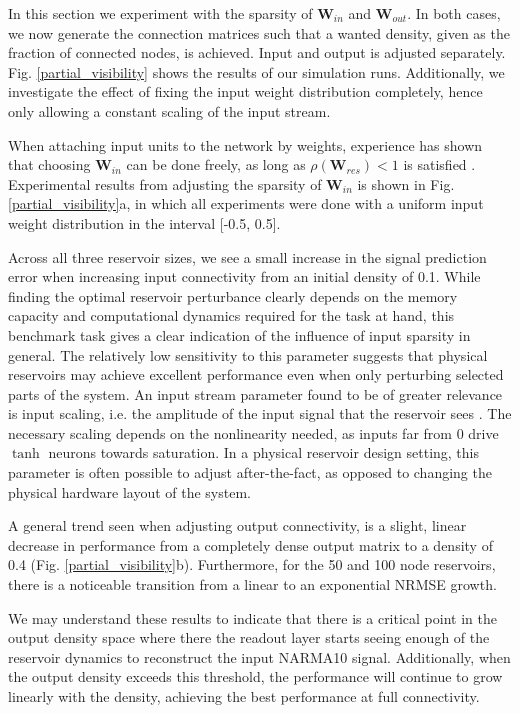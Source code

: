 In this section we experiment with the sparsity of $\mathbf{W}_{in}$ and
$\mathbf{W}_{out}$. In both cases, we now generate the connection matrices such
that a wanted density, given as the fraction of connected nodes, is
achieved. Input and output is adjusted separately. Fig. \ref{partial_visibility}
shows the results of our simulation runs. Additionally, we investigate the
effect of fixing the input weight distribution completely, hence only allowing a
constant scaling of the input stream.

When attaching input units to the network by weights, experience has shown that
choosing $\mathbf{W}_{in}$ can be done freely, as long as
$\rho(\mathbf{W}_{res}) < 1$ is satisfied \cite{jaeger_echo_2001}. Experimental
results from adjusting the sparsity of $\mathbf{W}_{in}$ is shown in
Fig. \ref{partial_visibility}a, in which all experiments were done with a
uniform input weight distribution in the interval [-0.5, 0.5].

Across all three reservoir sizes, we see a small increase in the signal
prediction error when increasing input connectivity from an initial density of
0.1. While finding the optimal reservoir perturbance clearly depends on the
memory capacity and computational dynamics required for the task at hand, this
benchmark task gives a clear indication of the influence of input sparsity in
general. The relatively low sensitivity to this parameter suggests that physical
reservoirs may achieve excellent performance even when only perturbing selected
parts of the system. An input stream parameter found to be of greater relevance
is input scaling, i.e. the amplitude of the input signal that the reservoir sees
\cite{alippi_quantification_2009}. The necessary scaling depends on the
nonlinearity needed, as inputs far from 0 drive $\tanh$ neurons towards
saturation. In a physical reservoir design setting, this parameter is often
possible to adjust after-the-fact, as opposed to changing the physical hardware
layout of the system.

A general trend seen when adjusting output connectivity, is a slight, linear
decrease in performance from a completely dense output matrix to a density of
0.4 (Fig. \ref{partial_visibility}b). Furthermore, for the 50 and 100 node
reservoirs, there is a noticeable transition from a linear to an exponential
NRMSE growth.

We may understand these results to indicate that there is a critical point in
the output density space where there the readout layer starts seeing enough of
the reservoir dynamics to reconstruct the input NARMA10 signal. Additionally,
when the output density exceeds this threshold, the performance will continue to
grow linearly with the density, achieving the best performance at full
connectivity.

